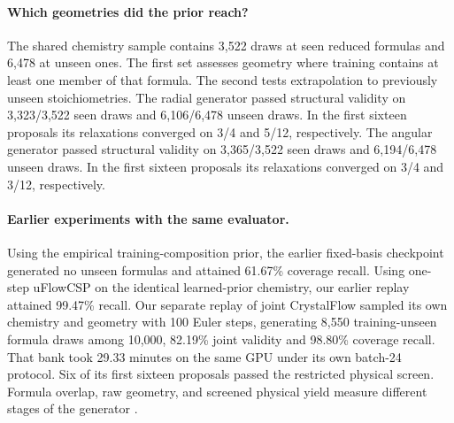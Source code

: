 \paragraph{Which geometries did the prior reach?} The shared chemistry sample contains 3,522 draws at seen reduced formulas and 6,478 at unseen ones. The first set assesses geometry where training contains at least one member of that formula. The second tests extrapolation to previously unseen stoichiometries.
The radial generator passed structural validity on 3,323/3,522 seen draws and 6,106/6,478 unseen draws. In the first sixteen proposals its relaxations converged on 3/4 and 5/12, respectively.
The angular generator passed structural validity on 3,365/3,522 seen draws and 6,194/6,478 unseen draws. In the first sixteen proposals its relaxations converged on 3/4 and 3/12, respectively.
\paragraph{Earlier experiments with the same evaluator.} Using the empirical training-composition prior, the earlier fixed-basis checkpoint generated no unseen formulas and attained 61.67\% coverage recall. Using one-step uFlowCSP on the identical learned-prior chemistry, our earlier replay attained 99.47\% recall. Our separate replay of joint CrystalFlow sampled its own chemistry and geometry with 100 Euler steps, generating 8,550 training-unseen formula draws among 10,000, 82.19\% joint validity and 98.80\% coverage recall. That bank took 29.33 minutes on the same GPU under its own batch-24 protocol. Six of its first sixteen proposals passed the restricted physical screen. Formula overlap, raw geometry, and screened physical yield measure different stages of the generator \cite{uflow,crystalflow}.
